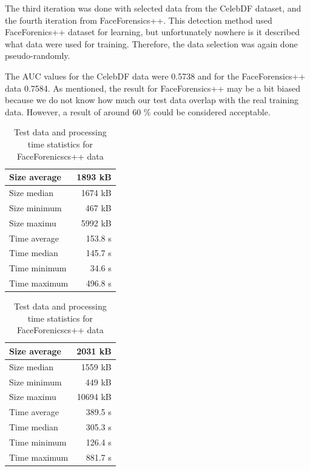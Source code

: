 The third iteration was done with selected data from the CelebDF dataset, and the fourth iteration from FaceForensics++. This detection method used FaceForenics++ dataset for learning, but unfortunately nowhere is it described what data were used for training. Therefore, the data selection was again done pseudo-randomly.

The AUC values for the CelebDF data were 0.5738 and for the FaceForensics++ data 0.7584. As mentioned, the result for FaceForensics++ may be a bit biased because we do not know how much our test data overlap with the real training data. However, a result of around 60 \% could be considered acceptable.

\begin{table}[H]
    \begin{minipage}[c]{.5\textwidth}
        \centering
        \begin{tabular}{|l|r|}
            \hline
            Size average & 1893 kB \\ \hline
            Size median & 1674 kB \\ \hline
            Size minimum & 467 kB \\ \hline
            Size maximu & 5992 kB \\ \hline
            Time average & 153.8 s \\ \hline
            Time median & 145.7 s \\ \hline
            Time minimum & 34.6 s \\ \hline
            Time maximum & 496.8 s \\ \hline
        \end{tabular}
        \caption{Test data and processing time statistics for CelebDF data}
        \label{table:celebdf_statistics}
    \end{minipage}
    \begin{minipage}[c]{.5\textwidth}
        \centering
        \begin{tabular}{|l|r|}
            \hline
            Size average & 2031 kB \\ \hline
            Size median & 1559 kB \\ \hline
            Size minimum & 449 kB \\ \hline
            Size maximu & 10694 kB \\ \hline
            Time average & 389.5 s \\ \hline
            Time median & 305.3 s \\ \hline
            Time minimum & 126.4 s \\ \hline
            Time maximum & 881.7 s \\ \hline
        \end{tabular}
        \caption{Test data and processing time statistics for FaceForenicscs++ data}
        \label{table:ff_statistics}
    \end{minipage}
\end{table}

